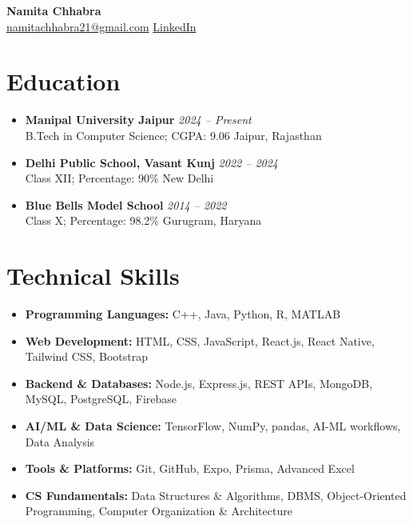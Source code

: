 \documentclass[9pt]{extarticle}
\newenvironment{tightitemize}{
  \begin{itemize}[leftmargin=0.14in, itemsep=0pt, topsep=1pt, parsep=0pt, partopsep=0pt]
}{
  \end{itemize}
}
\begin{document}
\fontsize{8.7}{9.5}\selectfont

\begin{center}
  {\Large \textbf{Namita Chhabra}}\\[-1pt]
  \href{mailto:namitachhabra21@gmail.com}{namitachhabra21@gmail.com}  \quad
  \href{https://www.linkedin.com/in/namita-chhabra-2b6881219}{LinkedIn}
\end{center}
\vspace{-8pt}

\section{Education}
\begin{tightitemize}
  \item \textbf{Manipal University Jaipur} \hfill \textit{2024 -- Present}\\
  B.Tech in Computer Science; CGPA: 9.06 \hfill Jaipur, Rajasthan
  \item \textbf{Delhi Public School, Vasant Kunj} \hfill \textit{2022 -- 2024}\\
  Class XII; Percentage: 90\% \hfill New Delhi
  \item \textbf{Blue Bells Model School} \hfill \textit{2014 -- 2022}\\
  Class X; Percentage: 98.2\% \hfill Gurugram, Haryana
\end{tightitemize}
\vspace{-5pt}

\section{Technical Skills}
\begin{tightitemize}
  \item \textbf{Programming Languages:} C++, Java, Python, R, MATLAB
  \item \textbf{Web Development:} HTML, CSS, JavaScript, React.js, React Native, Tailwind CSS, Bootstrap
  \item \textbf{Backend \& Databases:} Node.js, Express.js, REST APIs, MongoDB, MySQL, PostgreSQL, Firebase
  \item \textbf{AI/ML \& Data Science:} TensorFlow, NumPy, pandas, AI-ML workflows, Data Analysis
  \item \textbf{Tools \& Platforms:} Git, GitHub, Expo, Prisma, Advanced Excel
  \item \textbf{CS Fundamentals:} Data Structures \& Algorithms, DBMS, Object-Oriented Programming, Computer Organization \& Architecture
\end{tightitemize}
\vspace{-5pt}
\end{document}

